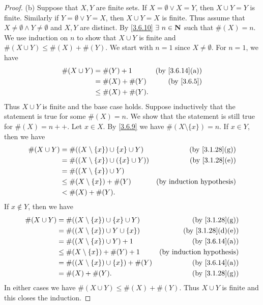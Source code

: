 \begin{proof}{(b)}
  Suppose that \(X, Y\) are finite sets.
  If \(X = \emptyset \lor X = Y\), then \(X \cup Y = Y\) is finite.
  Similarly if \(Y = \emptyset \lor Y = X\), then \(X \cup Y = X\) is finite.
  Thus assume that \(X \neq \emptyset \land Y \neq \emptyset\) and \(X, Y\) are distinct.
  By \cref{3.6.10} \(\exists\ n \in \N\) such that \(\#(X) = n\).
  We use induction on \(n\) to show that \(X \cup Y\) is finite and \(\#(X \cup Y) \leq \#(X) + \#(Y)\).
  We start with \(n = 1\) since \(X \neq \emptyset\).
  For \(n = 1\), we have
  \begin{align*}
    \#(X \cup Y) & = \#(Y) + 1         & \text{(by \cref{3.6.14}(a))} \\
                 & = \#(X) + \#(Y)     & \text{(by \cref{3.6.5})}     \\
                 & \leq \#(X) + \#(Y).
  \end{align*}
  Thus \(X \cup Y\) is finite and the base case holds.
  Suppose inductively that the statement is true for some \(\#(X) = n\).
  We show that the statement is still true for \(\#(X) = n++\).
  Let \(x \in X\).
  By \cref{3.6.9} we have \(\#(X \setminus \{x\}) = n\).
  If \(x \in Y\), then we have
  \begin{align*}
    \#(X \cup Y) & = \#((X \setminus \{x\}) \cup \{x\} \cup Y)   & \text{(by \cref{3.1.28}(g))}     \\
                 & = \#((X \setminus \{x\}) \cup (\{x\} \cup Y)) & \text{(by \cref{3.1.28}(e))}     \\
                 & = \#((X \setminus \{x\}) \cup Y)                                                 \\
                 & \leq \#(X \setminus \{x\}) + \#(Y)            & \text{(by induction hypothesis)} \\
                 & < \#(X) + \#(Y).
  \end{align*}
  If \(x \notin Y\), then we have
  \begin{align*}
    \#(X \cup Y) & = \#((X \setminus \{x\}) \cup \{x\} \cup Y)  & \text{(by \cref{3.1.28}(g))}     \\
                 & = \#((X \setminus \{x\}) \cup Y \cup \{x\})  & \text{(by \cref{3.1.28}(d)(e))}  \\
                 & = \#((X \setminus \{x\}) \cup Y) + 1         & \text{(by \cref{3.6.14}(a))}     \\
                 & \leq \#(X \setminus \{x\}) + \#(Y) + 1       & \text{(by induction hypothesis)} \\
                 & = \#((X \setminus \{x\}) \cup \{x\}) + \#(Y) & \text{(by \cref{3.6.14}(a))}     \\
                 & = \#(X) + \#(Y).                             & \text{(by \cref{3.1.28}(g))}
  \end{align*}
  In either cases we have \(\#(X \cup Y) \leq \#(X) + \#(Y)\).
  Thus \(X \cup Y\) is finite and this closes the induction.


\end{proof}
